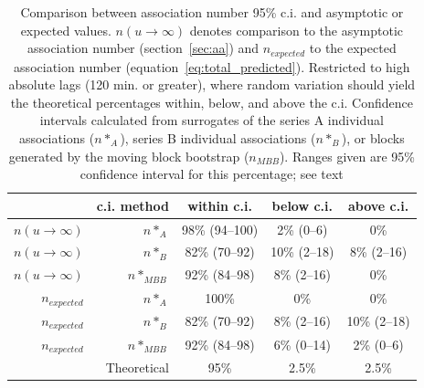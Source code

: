 \documentclass[letterpaper,11pt]{article}
\begin{document}
\begin{table}
\begin{center}
\caption{ Comparison between association number 95\% c.i. and
asymptotic or expected values.\newline
{\footnotesize $n(u\rightarrow\infty)$ denotes comparison to the
asymptotic association number (section~\ref{sec:aa}) and
$n_{expected}$ to the expected association number
(equation~\ref{eq:total_predicted}). Restricted to high absolute lags
(120 min. or greater), where random variation should yield the
theoretical percentages within, below, and above the c.i.  Confidence
intervals calculated from surrogates of the series A individual
associations ($n*_{A}$), series B individual associations ($n*_{B}$),
or blocks generated by the moving block bootstrap ($n_{MBB}$).  Ranges
given are 95\% confidence interval for this percentage; see text }}
\label{table:ci_comparison}
\bigskip
\begin{tabular}{rr|ccc}
 & c.i. method & within c.i. & below c.i. & above c.i. \\
\hline
$n(u\rightarrow\infty)$ & $n*_{A}$ & 98\% (94--100) & 2\% (0--6) & 0\% \\
$n(u\rightarrow\infty)$ & $n*_{B}$ & 82\% (70--92) & 10\% (2--18) & 8\% (2--16)\\
$n(u\rightarrow\infty)$ & $n*_{MBB}$ & 92\% (84--98) & 8\% (2--16) & 0\% \\
$n_{expected}$ & $n*_{A}$ & 100\% & 0\% & 0\% \\
$n_{expected}$ & $n*_{B}$ & 82\% (70--92) & 8\% (2--16) & 10\% (2--18) \\
$n_{expected}$ & $n*_{MBB}$ & 92\% (84--98) & 6\% (0--14) & 2\% (0--6)\\
\multicolumn{2}{r|}{Theoretical} & 95\% & 2.5\% & 2.5\% \\
\end{tabular}

\end{center}
\end{table}
\end{document}
